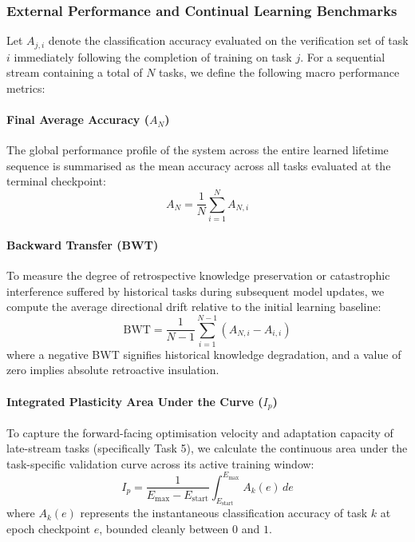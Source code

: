 \documentclass[10pt,a4paper]{article}
\begin{document}
	\subsubsection{External Performance and Continual Learning Benchmarks}
	Let $A_{j,i}$ denote the classification accuracy evaluated on the verification set of task $i$ immediately following the completion of training on task $j$. For a sequential stream containing a total of $N$ tasks, we define the following macro performance metrics:
	
	\paragraph{Final Average Accuracy ($A_N$)} 
	The global performance profile of the system across the entire learned lifetime sequence is summarised as the mean accuracy across all tasks evaluated at the terminal checkpoint:
	\begin{equation}
		A_N = \frac{1}{N} \sum_{i=1}^N A_{N,i}
	\end{equation}
	
	\paragraph{Backward Transfer (BWT)} 
	To measure the degree of retrospective knowledge preservation or catastrophic interference suffered by historical tasks during subsequent model updates, we compute the average directional drift relative to the initial learning baseline:
	\begin{equation}
		\text{BWT} = \frac{1}{N-1} \sum_{i=1}^{N-1} \left( A_{N,i} - A_{i,i} \right)
	\end{equation}
	where a negative BWT signifies historical knowledge degradation, and a value of zero implies absolute retroactive insulation.
	
	\paragraph{Integrated Plasticity Area Under the Curve ($I_p$)}
	To capture the forward-facing optimisation velocity and adaptation capacity of late-stream tasks (specifically Task 5), we calculate the continuous area under the task-specific validation curve across its active training window:
	\begin{equation}
		I_p = \frac{1}{E_{\max} - E_{\text{start}}} \int_{E_{\text{start}}}^{E_{\max}} A_k(e) \, de
	\end{equation}
	where $A_k(e)$ represents the instantaneous classification accuracy of task $k$ at epoch checkpoint $e$, bounded cleanly between $0$ and $1$.
	
\end{document}
